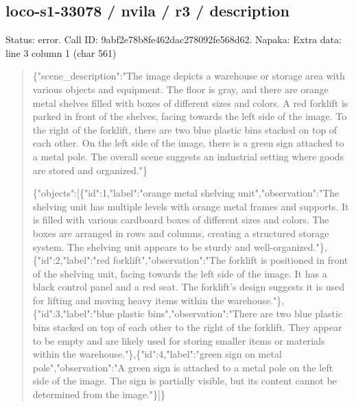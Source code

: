 \documentclass[10pt,a4paper]{article}
\begin{document}
\subsection*{loco-s1-33078 / nvila / r3 / description}
Status: error. Call ID: 9abf2e78b8fe462dac278092fe568d62. Napaka: Extra data: line 3 column 1 (char 561)
\begin{quote}\footnotesize
\{"scene\_description":\allowbreak{}"The image depicts a warehouse or storage area with various objects and equipment. The floor is gray,\allowbreak{} and there are orange metal shelves filled with boxes of different sizes and colors. A red forklift is parked in front of the shelves,\allowbreak{} facing towards the left side of the image. To the right of the forklift,\allowbreak{} there are two blue plastic bins stacked on top of each other. On the left side of the image,\allowbreak{} there is a green sign attached to a metal pole. The overall scene suggests an industrial setting where goods are stored and organized."\}\par
\par
\{"objects":\allowbreak{}[\{"id":\allowbreak{}1,\allowbreak{}"label":\allowbreak{}"ora\allowbreak{}nge metal shelving unit",\allowbreak{}"observation":\allowbreak{}"The shelving unit has multiple levels with orange metal frames and supports. It is filled with various cardboard boxes of different sizes and colors. The boxes are arranged in rows and columns,\allowbreak{} creating a structured storage system. The shelving unit appears to be sturdy and well-organized."\},\allowbreak{}\{"id":\allowbreak{}2,\allowbreak{}"label\allowbreak{}":\allowbreak{}"red forklift",\allowbreak{}"observation":\allowbreak{}"The forklift is positioned in front of the shelving unit,\allowbreak{} facing towards the left side of the image. It has a black control panel and a red seat. The forklift's design suggests it is used for lifting and moving heavy items within the warehouse."\},\allowbreak{}\{"id":\allowbreak{}3,\allowbreak{}"label":\allowbreak{}"bl\allowbreak{}ue plastic bins",\allowbreak{}"observation":\allowbreak{}"There are two blue plastic bins stacked on top of each other to the right of the forklift. They appear to be empty and are likely used for storing smaller items or materials within the warehouse."\},\allowbreak{}\{"id":\allowbreak{}4,\allowbreak{}"label":\allowbreak{}"gr\allowbreak{}een sign on metal pole",\allowbreak{}"observation":\allowbreak{}"A green sign is attached to a metal pole on the left side of the image. The sign is partially visible,\allowbreak{} but its content cannot be determined from the image."\}]\}
\end{quote}
\end{document}
